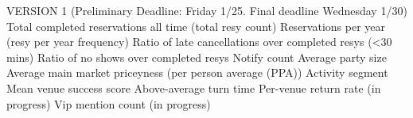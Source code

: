 VERSION 1 (Preliminary Deadline: Friday 1/25. Final deadline Wednesday 1/30)   
Total completed reservations all time (total resy count)  
Reservations per year (resy per year frequency)  
Ratio of late cancellations over completed resys (<30 mins)  
Ratio of no shows over completed resys  
Notify count  
Average party size  
Average main market priceyness (per person average (PPA))  
Activity segment  
Mean venue success score  
Above-average turn time  
Per-venue return rate (in progress)    
Vip mention count (in progress)  
